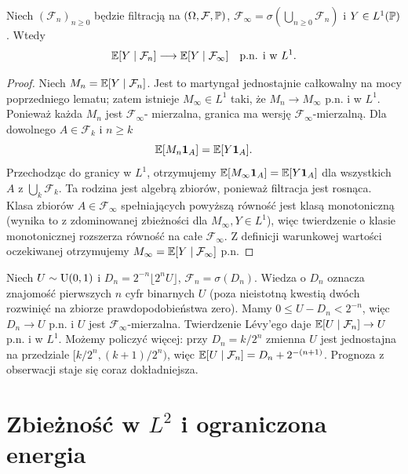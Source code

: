 \begin{twierdzenie}
Niech $(\mathcal F_n)_{n\geq0}$ będzie filtracją
na $(\Omega,\mathcal F,\mathbb{P})$,
$\mathcal F_\infty=\sigma(\bigcup_{n\geq0}\mathcal F_n)$
i $Y\in L^1(\mathbb{P})$. Wtedy
\[
\mathbb{E}[Y\mid\mathcal F_n]
\longrightarrow\mathbb{E}[Y\mid\mathcal F_\infty]
\quad\text{p.n. i w }L^1.
\]
\end{twierdzenie}
\begin{proof}
Niech $M_n=\mathbb{E}[Y\mid\mathcal F_n]$.
Jest to martyngał jednostajnie całkowalny
na mocy poprzedniego lematu; zatem istnieje
$M_\infty\in L^1$ taki, że $M_n\to M_\infty$
p.n. i w $L^1$.
Ponieważ każda $M_n$ jest $\mathcal F_\infty$-
mierzalna, granica ma wersję
$\mathcal F_\infty$-mierzalną.
Dla dowolnego $A\in\mathcal F_k$ i $n\geq k$
\[
\mathbb{E}[M_n\mathbf{1}_{A}]=\mathbb{E}[Y\mathbf{1}_{A}].
\]
Przechodząc do granicy w $L^1$, otrzymujemy
$\mathbb{E}[M_\infty\mathbf{1}_{A}]=\mathbb{E}[Y\mathbf{1}_{A}]$
dla wszystkich $A$ z $\bigcup_k\mathcal F_k$.
Ta rodzina jest algebrą zbiorów, ponieważ
filtracja jest rosnąca. Klasa zbiorów
$A\in\mathcal F_\infty$ spełniających powyższą
równość jest klasą monotoniczną (wynika to
z zdominowanej zbieżności dla
$M_\infty,Y\in L^1$), więc twierdzenie
o klasie monotonicznej rozszerza równość
na całe $\mathcal F_\infty$.
Z definicji warunkowej wartości oczekiwanej
otrzymujemy
$M_\infty=\mathbb{E}[Y\mid\mathcal F_\infty]$ p.n.
\end{proof}

\begin{przyklad}
Niech $U\sim\operatorname{U}(0,1)$ i
$D_n=2^{-n}\lfloor2^nU\rfloor$,
$\mathcal F_n=\sigma(D_n)$.
Wiedza o $D_n$ oznacza znajomość pierwszych
$n$ cyfr binarnych $U$ (poza nieistotną
kwestią dwóch rozwinięć na zbiorze
prawdopodobieństwa zero). Mamy
$0\leq U-D_n<2^{-n}$, więc $D_n\to U$ p.n.
i $U$ jest $\mathcal F_\infty$-mierzalna.
Twierdzenie Lévy'ego daje
$\mathbb{E}[U\mid\mathcal F_n]\to U$ p.n. i w $L^1$.
Możemy policzyć więcej: przy $D_n=k/2^n$
zmienna $U$ jest jednostajna na przedziale
$[k/2^n,(k+1)/2^n)$, więc
$\mathbb{E}[U\mid\mathcal F_n]=D_n+2^{-(n+1)}$.
Prognoza z obserwacji staje się coraz dokładniejsza.
\end{przyklad}

\section{Zbieżność w \texorpdfstring{$L^2$}{L2} i ograniczona energia}

